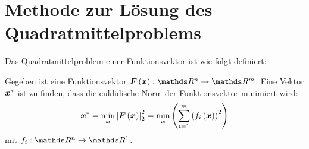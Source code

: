 \section{Methode zur Lösung des Quadratmittelproblems}
\label{Methode-zur-Lösung-des-Quadratmittelproblems}
Das Quadratmittelproblem einer Funktionsvektor ist wie folgt definiert\cite{knorrenschild2017numerische}:
\begin{definition}[Quadratmittelproblem]
Gegeben ist eine Funktionsvektor ${\vect{F\left (\vect{x}\right )}}: \Reals^{n}\to \Reals^{m}$. Eine Vektor ${\boldsymbol x^{\ast}}$ ist zu finden, dass die euklidische Norm der Funktionsvektor minimiert wird:
\begin{eqnarray}
{\boldsymbol x^{\ast}} = \mathop {\min }\limits_{\boldsymbol x}\left | {\boldsymbol F}\left ( {\boldsymbol x} \right ) \right |_{2}^{2} = \mathop {\min }\limits_{\boldsymbol x}\left ( \sum_{i=1}^{m}\left ( f_{i}\left ( \boldsymbol x \right ) \right )^{2}\right )
\label{Def_LSP}\notag\\
\end{eqnarray}
mit $f_{i}: \Reals^{n}\to \Reals^{1}$.
\end{definition}
